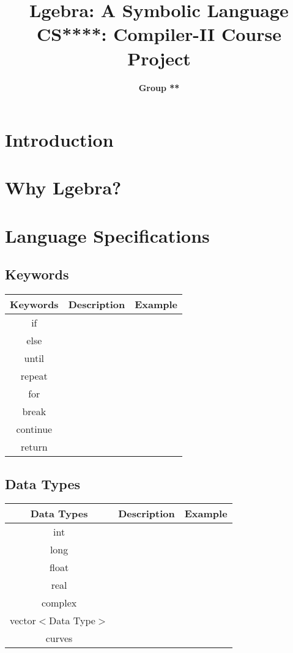 \documentclass[12pt]{article}
\title{\LARGE \textbf{Lgebra: A Symbolic Language} \\\large \textbf{CS****: Compiler-II Course Project}}
\author{\textbf{Group **}}
\begin{document}
    \maketitle
    \tableofcontents
    
    \newpage
    \section{Introduction}
    \section{Why Lgebra?}
    \section{Language Specifications}
    \subsection{Keywords}
    \begin{table}[H]
        \centering
        \begin{tabular}{|c|c|c|}
            \hline
            \textbf{Keywords} & \textbf{Description} & \textbf{Example} \\
            \hline
            if & & \\
            \hline
            else & & \\
            \hline
            until & & \\
            \hline
            repeat & & \\
            \hline
            for & & \\
            \hline
            break & & \\
            \hline
            continue & & \\
            \hline
            return & & \\
            \hline
        \end{tabular}
    \end{table}
    \subsection{Data Types}
    \begin{table}[H]
        \centering
        \begin{tabular}{|c|c|c|}
            \hline
            \textbf{Data Types} & \textbf{Description} & \textbf{Example} \\
            \hline
            int & & \\
            \hline
            long & & \\
            \hline
            float & & \\
            \hline
            real & & \\
            \hline
            complex & & \\
            \hline
            vector$<$Data Type$>$ & & \\
            \hline
            curves & & \\
            \hline
        \end{tabular}
    \end{table}
\end{document}
